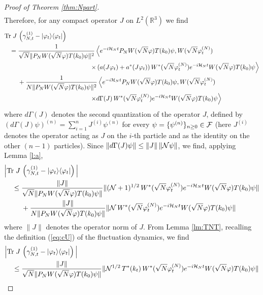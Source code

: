 \documentclass[11pt,a4paper]{article}
\newcommand{\bR}{{\mathbb R}}
\newcommand{\tr}{\mbox{Tr}}
\newcommand{\cF}{{\cal F}}
\newcommand{\cH}{{\cal H}}
\newcommand{\cN}{{\cal N}}
\begin{document}
\begin{proof}[Proof of Theorem \ref{thm:Npart}]
\[\begin{split}
\end{split} \]
Therefore, for any compact operator $J$ on $L^2 (\bR^3)$ we find 
\[ \begin{split} 
\tr \; J \, &\left( \gamma^{(1)}_{N,t} - |\varphi_t \rangle\langle \varphi_t| \right) \\ = \; &\frac{1}{\sqrt{N} \| P_N W(\sqrt{N} \varphi) T(k_0) \psi \|^2}  \left\langle  
e^{-i\cH_N t}  P_N W(\sqrt{N} \varphi) T(k_0) \psi , W (\sqrt{N} \varphi_t^{(N)}) \right. \\ & \left. \hspace{4cm} \times \left( a (J\varphi_t) + a^* (J \varphi_t) \right) W^*(\sqrt{N} \varphi_t^{(N)})  e^{-i\cH_N t}  W(\sqrt{N} \varphi) T(k_0) \psi \right\rangle
\\ &+  \frac{1}{N \| P_N W(\sqrt{N} \varphi) T(k_0) \psi \|^2} \left\langle  
e^{-i\cH_N t}  P_N W(\sqrt{N} \varphi) T(k_0) \psi , W (\sqrt{N} \varphi_t^{(N)}) \right. \\ &\hspace{4cm} \left.  \times d\Gamma (J) \, W^*(\sqrt{N} \varphi_t^{(N)})  e^{-i\cH_N t}  W(\sqrt{N} \varphi) T(k_0) \psi \right\rangle \end{split} \]
where $d\Gamma (J)$ denotes the second quantization of the operator $J$, defined by  
\( (d\Gamma (J) \psi)^{(n)} = \sum_{i=1}^n J^{(i)} \psi^{(n)} \)
for every $\psi = \{ \psi^{(n)} \}_{n\geq 0} \in \cF$ (here $J^{(i)}$ denotes the operator acting as $J$ on the $i$-th particle and as the identity on the other $(n-1)$ particles). Since $\| d\Gamma (J)  \psi \| \leq \| J \| \, \| \cN \psi \|$, we find, applying Lemma \ref{l:a}, 
\[ \begin{split}
\Big| \tr \; J \, &\left( \gamma^{(1)}_{N,t} - |\varphi_t \rangle\langle \varphi_t| \right)  \Big| \\ \leq \; &\frac{\| J \|}{\sqrt{N} \| P_N W(\sqrt{N} \varphi) T(k_0) \psi \|}   \| (\cN+1)^{1/2} \, W^*(\sqrt{N} \varphi_t^{(N)})  e^{-i\cH_N t}  W(\sqrt{N} \varphi) T(k_0) \psi \| 
\\ &+  \frac{\| J \|}{N \| P_N W(\sqrt{N} \varphi) T(k_0) \psi \|} \| \cN \, W^*(\sqrt{N} \varphi_t^{(N)})  e^{-i\cH_N t}  W(\sqrt{N} \varphi) T(k_0) \psi \|  \end{split} \]
where $\| J \|$ denotes the operator norm of $J$. {F}rom Lemma \ref{lm:TNT}, recalling the definition 
(\ref{eq:cU}) of the fluctuation dynamics, we find
\[  \begin{split}
\Big| \tr \; J \, &\left( \gamma^{(1)}_{N,t} - |\varphi_t \rangle\langle \varphi_t| \right)  \Big| \\  \leq \; &\frac{\| J \|}{\sqrt{N} \| P_N W(\sqrt{N} \varphi) T(k_0) \psi \|}  \| \cN^{1/2} \,T^* (k_t) \,  W^* (\sqrt{N} \varphi_t^{(N)})  e^{-i\cH_N t}  W(\sqrt{N} \varphi) T(k_0) \psi \|  

\end{split}\]
\end{proof}
\end{document}
